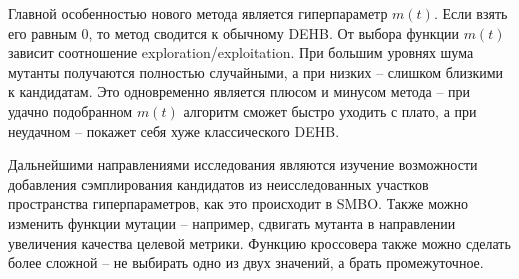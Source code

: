 \documentclass{article}
\begin{document}
Главной особенностью нового метода является гиперпараметр $m(t)$. Если взять его равным 0, то метод сводится к обычному DEHB. От выбора функции $m(t)$ зависит соотношение exploration/exploitation. При большим уровнях шума мутанты получаются полностью случайными, а при низких -- слишком близкими к кандидатам. Это одновременно является плюсом и минусом метода -- при удачно подобранном $m(t)$ алгоритм сможет быстро уходить с плато, а при неудачном -- покажет себя хуже классического DEHB.

Дальнейшими направлениями исследования являются изучение возможности добавления сэмплирования кандидатов из неисследованных участков пространства гиперпараметров, как это происходит в SMBO. Также можно изменить функции мутации -- например, сдвигать мутанта в направлении увеличения качества целевой метрики. Функцию кроссовера также можно сделать более сложной -- не выбирать одно из двух значений, а брать промежуточное.












\end{document}
